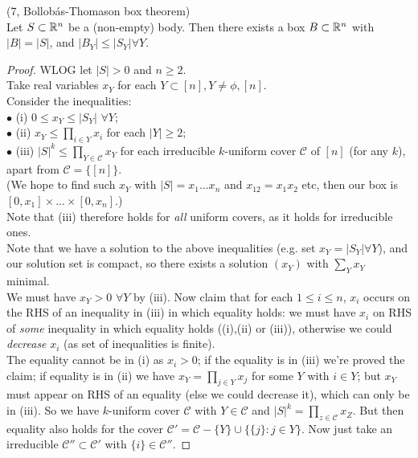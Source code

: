 \documentclass[a4paper]{article}
\begin{document}
\begin{thm} (7, Bollob\'as-Thomason box theorem)\\
    Let $S \subset \mathbb{R}^n$ be a (non-empty) body. Then there exists a box $B \subset \mathbb{R}^n$ with $|B| = |S|$, and $|B_Y| \leq |S_Y| \forall Y$.
    \begin{proof}
        WLOG let $|S| > 0$ and $n \geq 2$.\\
        Take real variables $x_Y$ for each $Y \subset [n], Y \neq \phi,[n]$.\\
        Consider the inequalities:\\
        $\bullet$ (i) $0 \leq x_Y \leq |S_Y|$ $\forall Y$;\\
        $\bullet$ (ii) $x_Y \leq \prod_{i \in Y} x_i$ for each $|Y| \geq 2$;\\
        $\bullet$ (iii) $|S|^k \leq \prod_{Y \in \mathcal{C}} x_Y$ for each irreducible $k$-uniform cover $\mathcal{C}$ of $[n]$ (for any $k$), apart from $\mathcal{C}=\{[n]\}$.\\
        (We hope to find such $x_Y$ with $|S| = x_1...x_n$ and $x_{12} = x_1x_2$ etc, then our box is $[0,x_1] \times ... \times [0,x_n]$.)\\
        Note that (iii) therefore holds for \emph{all} uniform covers, as it holds for irreducible ones.\\
        Note that we have a solution to the above inequalities (e.g. set $x_Y = |S_Y| \forall Y$), and our solution set is compact, so there exists a solution $(x_Y)$ with $\sum_Y x_Y$ minimal.\\
        We must have $x_Y > 0$ $\forall Y$ by (iii). Now claim that for each $1\leq i \leq n$, $x_i$ occurs on the RHS of an inequality in (iii) in which equality holds: we must have $x_i$ on RHS of \emph{some} inequality in which equality holds ((i),(ii) or (iii)), otherwise we could \emph{decrease} $x_i$ (as set of inequalities is finite).\\
        The equality cannot be in (i) as $x_i>0$; if the equality is in (iii) we're proved the claim; if equality is in (ii) we have $x_Y = \prod_{j \in Y} x_j$ for some $Y$ with $i \in Y$; but $x_Y$ must appear on RHS of an equality (else we could decrease it), which can only be in (iii). So we have $k$-uniform cover $\mathcal{C}$ with $Y \in \mathcal{C}$ and $|S|^k = \prod_{z \in \mathcal{C}} x_Z$. But then equality also holds for the cover $\mathcal{C}' = \mathcal{C}-\{Y\} \cup \{\{j\}:j \in Y\}$. Now just take an irreducible $\mathcal{C}'' \subset \mathcal{C}'$ with $\{i\} \in \mathcal{C}''$.


\end{proof}
\end{thm}
\end{document}

